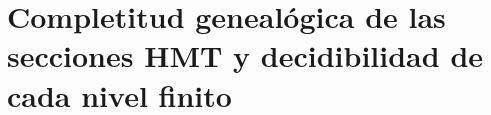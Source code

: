 \chapter{Completitud genealógica de las secciones HMT y decidibilidad de cada nivel finito}
\label{chap:p3-final:53:completitud_finita}

